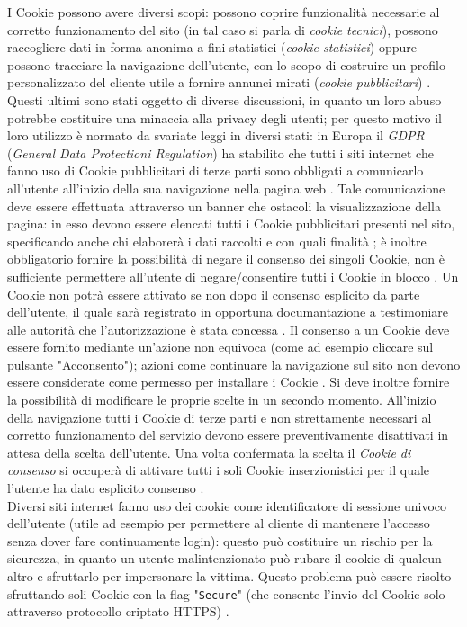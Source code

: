 \documentclass[a4paper, 12pt, twoside, openright]{book}
\begin{document}
I Cookie possono avere diversi scopi: possono coprire funzionalità necessarie al corretto funzionamento del sito (in tal caso si parla di \textit{cookie tecnici}), possono raccogliere dati in forma anonima a fini statistici (\textit{cookie statistici}) oppure possono tracciare la navigazione dell'utente, con lo scopo di costruire un profilo personalizzato del cliente utile a fornire annunci mirati (\textit{cookie pubblicitari}) \cite{Wiki:cookies}. Questi ultimi sono stati oggetto di diverse discussioni, in quanto un loro abuso potrebbe costituire una minaccia alla privacy degli utenti; per questo motivo il loro utilizzo è normato da svariate leggi in diversi stati: in Europa il \textit{GDPR} (\textit{General Data Protectioni Regulation}) ha stabilito che tutti i siti internet che fanno uso di Cookie pubblicitari di terze parti sono obbligati a comunicarlo all'utente all'inizio della sua navigazione nella pagina web \cite{Cookiebot}. Tale comunicazione deve essere effettuata attraverso un banner che ostacoli la visualizzazione della pagina: in esso devono essere elencati tutti i Cookie pubblicitari presenti nel sito, specificando anche chi elaborerà i dati raccolti e con quali finalità \cite{Cookiebot}; è inoltre obbligatorio fornire la possibilità di negare il consenso dei singoli Cookie, non è sufficiente permettere all'utente di negare/consentire tutti i Cookie in blocco \cite{Cookiebot}. Un Cookie non potrà essere attivato se non dopo il consenso esplicito da parte dell'utente, il quale sarà registrato in opportuna documantazione a testimoniare alle autorità che l'autorizzazione è stata concessa \cite{Cookiebot}. Il consenso a un Cookie deve essere fornito mediante un'azione non equivoca (come ad esempio cliccare sul pulsante "Acconsento"); azioni come continuare la navigazione sul sito non devono essere considerate come permesso per installare i Cookie \cite{Cookiebot}. Si deve inoltre fornire la possibilità di modificare le proprie scelte in un secondo momento. All'inizio della navigazione tutti i Cookie di terze parti e non strettamente necessari al corretto funzionamento del servizio devono essere preventivamente disattivati in attesa della scelta dell'utente. Una volta confermata la scelta il \textit{Cookie di consenso} si occuperà di attivare tutti i soli Cookie inserzionistici per il quale l'utente ha dato esplicito consenso \cite{Cookiebot}.\\
Diversi siti internet fanno uso dei cookie come identificatore di sessione univoco dell'utente (utile ad esempio per permettere al cliente di mantenere l'accesso senza dover fare continuamente login): questo può costituire un rischio per la sicurezza, in quanto un utente malintenzionato può rubare il cookie di qualcun altro e sfruttarlo per impersonare la vittima. Questo problema può essere risolto sfruttando soli Cookie con la flag "\texttt{Secure}" (che consente l'invio del Cookie solo attraverso protocollo criptato HTTPS) \cite{Wiki:cookies}.
\end{document}
